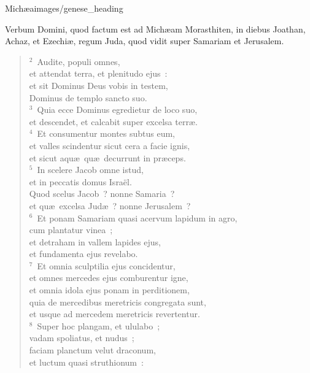 {Michæa}{images/genese_heading}


\lettrine[lines=6,image=true,loversize=0.05,lraise=-0.03]{V}{}erbum Domini, quod factum est ad Mich\ae am Morasthiten, in diebus Joathan, Achaz, et Ezechi\ae , regum Juda, quod vidit super Samariam et Jerusalem.


\begin{flushleft}\begin{verse}\vspace{6pt}${}^{2}$~Audite, populi omnes,\\ et attendat terra, et plenitudo ejus~:\\ et sit Dominus Deus vobis in testem,\\ Dominus de templo sancto suo.\\
${}^{3}$~Quia ecce Dominus egredietur de loco suo,\\ et descendet, et calcabit super excelsa terr\ae .\\
${}^{4}$~Et consumentur montes subtus eum,\\ et valles scindentur sicut cera a facie ignis,\\ et sicut aqu\ae\ qu\ae\ decurrunt in pr\ae ceps.\\
${}^{5}$~In scelere Jacob omne istud,\\ et in peccatis domus Isra\"el.\\ Quod scelus Jacob~? nonne Samaria~?\\ et qu\ae\ excelsa Jud\ae~? nonne Jerusalem~?\\
${}^{6}$~Et ponam Samariam quasi acervum lapidum in agro,\\ cum plantatur vinea~;\\ et detraham in vallem lapides ejus,\\ et fundamenta ejus revelabo.\\
${}^{7}$~Et omnia sculptilia ejus concidentur,\\ et omnes mercedes ejus comburentur igne,\\ et omnia idola ejus ponam in perditionem,\\ quia de mercedibus meretricis congregata sunt,\\ et usque ad mercedem meretricis revertentur.\\
${}^{8}$~Super hoc plangam, et ululabo~;\\ vadam spoliatus, et nudus~;\\ faciam planctum velut draconum,\\ et luctum quasi struthionum~:\\

\end{verse}
\end{flushleft}
